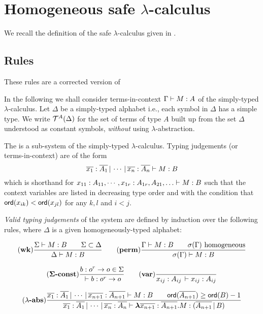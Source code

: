 \section{Homogeneous safe $\lambda$-calculus}
\label{sec:safe_alt}

We recall the definition of the safe $\lambda$-calculus given in
\cite{Ong2005}.

\subsection{Rules}

These rules are a corrected version of
\cite{DBLP:conf/fossacs/AehligMO05}

In the following we shall consider terms-in-context ${{\Gamma} \vdash {M
: A}}$ of the simply-typed $\lambda$-calculus. Let $\Delta$ be a
simply-typed alphabet i.e., each symbol in $\Delta$ has a simple
type. We write ${\cal T}^{A}(\Delta)$ for the set of terms of type $A$
built up from the set $\Delta$ understood as constant symbols,
\emph{without} using $\lambda$-abstraction.


The  is a sub-system of the
simply-typed $\lambda$-calculus. Typing judgements (or
terms-in-context) are of the form
\begin{equation}
\nonumber {{\overline{x_1}:\overline{A_1} \, | \, \cdots \, | \,
\overline{x_n} :  \overline{A_n}} \vdash {M : B}}
\end{equation}
which is shorthand for ${{x_{11} : A_{11}, \cdots, x_{1r}:
A_{1r}, A_{21},\ldots } \vdash {M : B}}$ such that the context variables are listed in decreasing type order and
 with the condition that ${\sf ord}(x_{ik}) < {\sf ord}(x_{jl})$ for any $k, l$ and $i<j$.

\emph{Valid typing judgements} of the
system are defined by induction over the following rules, where
$\Delta$ is a given homogeneously-typed alphabet:

$$ \mathbf{(wk)}
    {   \frac{\displaystyle  {{\Sigma} \vdash {M:B}} \qquad {\Sigma \subset \Delta} }{ {{\Delta } \vdash {M : B}}}
   }
\qquad
    \mathbf{(perm)}
    {
      \frac{\displaystyle  {{\Gamma} \vdash {M:B}} \qquad \sigma(\Gamma) \hbox{ homogeneous} }{ {{\sigma(\Gamma)} \vdash {M : B}} }
    }
$$


$$ \mathbf{(\Sigma\mbox{\textbf{-const}})}  \frac{\displaystyle b : o^r \rightarrow o \in \Sigma}{{{} \vdash {b : o^r \rightarrow o}}}
\qquad
 \mathbf{(var)} \frac{\displaystyle }{{{x_{ij} : A_{ij}\, } \vdash {x_{ij} : A_{ij}}}}
$$

$$ \mathbf{(\lambda\mbox{\textbf{-abs}})}
\frac{\displaystyle  {{{\overline{x_1} : \overline{A_1}\, | \, \cdots\, | \,
\overline{x_{n+1}} : \overline{A_{n+1}}} \vdash {M : B}}} \qquad
{\sf ord}(\overline{A_{n+1}}) \geq {\sf ord}(B) -1}{{{\overline{x_1} :
\overline{A_1}\, | \, \cdots\, | \, \overline{x_{n}} :
\overline{A_{n}}} \vdash {{\hbox{\boldmath $\lambda$}{\overline{x_{n+1}} : \overline{A_{n+1}}}.{M}}
: (\overline{A_{n+1}} \, | \, B)}}} $$

